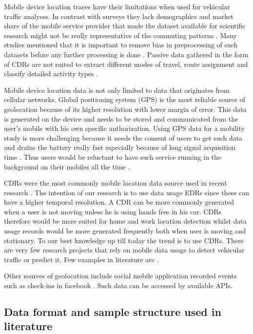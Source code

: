 \documentclass[12pt, a4paper]{report}
\theoremstyle{definition}
\theoremstyle{definition}%
\theoremstyle{definition}%
\theoremstyle{definition}%
\theoremstyle{definition}%
\theoremstyle{definition}%
\begin{document}
Mobile device location traces have their limitations when used for vehicular traffic analyses. In contrast with surveys they lack demographics \cite{Calabrese2013,Colak2015} and market share of the mobile service provider that made the dataset available for scientific research might not be really representative of the commuting patterns \cite{Calabrese2011}. Many studies mentioned that it is important to remove bias in preprocessing of such datasets before any further processing is done \cite{Iqbal2014,Toole2015}.  Passive data gathered in the form of CDRs are not suited to extract different modes of travel, route assignment and classify detailed activity types \cite{Colak2015}.

Mobile device location data is not only limited to data that originates from cellular networks. Global positioning system (GPS) is the most reliable source of geolocation because of its higher resolution with lower margin of error. This data is generated on the device and needs to be stored and communicated from the user's mobile with his own specific authorization. Using GPS data for a mobility study is more challenging because it needs the consent of users to get such data and drains the battery really fast especially because of long signal acquisition time \cite{Wang2012}. Thus users would be reluctant to have such service running in the background on their mobiles all the time \cite{Ahas2011}. 

CDRs were the most commonly mobile location data source used in recent research \cite{Hoteit2016}. The intention of our research is to use data usage EDRs since these can have a higher temporal resolution. A CDR can be more commonly generated when a user is not moving unless he is using hands free in his car. CDRs therefore would be more suited for home and work location detection whilst data usage records would be more generated frequently both when user is moving and stationary. To our best knowledge up till today the trend is to use CDRs. There are very few research projects that rely on mobile data usage to detect vehicular traffic or predict it. Few examples in literature are  \cite{Hoteit2014,Calabrese2011}. 

Other sources of geolocation include social mobile application recorded events such as check-ins in facebook \cite{Hoteit2014}. Such data can be accessed by available APIs.

\subsection{Data format and sample structure used in literature} \label{methodoloy_sources}
\end{document}
